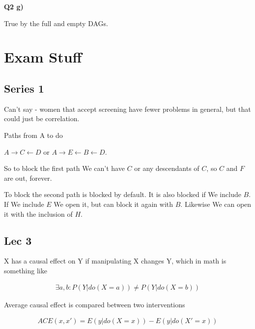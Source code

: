 \documentclass{article}
\begin{document}
		\textbf{Q2 g)}
		
			True by the full and empty DAGs.
			
			
			
\section{Exam Stuff}

	\subsection{Series 1}
	
		Can't say - women that accept screening have fewer problems in general, but that could just be correlation.
		
		Paths from A to do
		
		$A \rightarrow C \leftarrow D $ or $A \to E \leftarrow B \leftarrow D$.
		
		So to block the first path We can't have $C$ or any descendants of $C$, so $C$ and $F$ are out, forever.
		
		To block the second path is blocked by default. It is also blocked if We include $B$. If We include $E$ We open it, but can block it again with $B$. Likewise We can open it with the inclusion of $H$.
		
	\subsection{Lec 3}
	
		X has a causal effect on Y if manipulating X changes Y, which in math is something like 
		
		\begin{align}
			\exists a, b: P(Y|do(X=a))\neq P(Y|do(X=b))
		\end{align}
		
		Average causal effect is compared between two interventions
		
		\begin{align}
			ACE(x, x') = E(y|do(X=x)) - E(y|do(X'=x))
		\end{align}
		
		
		
		
		
		
		
			
			
			
			
			
			
			
\end{document}
